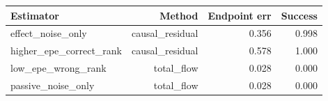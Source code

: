 \begin{tabular}{lrrr}
\toprule
Estimator & Method & Endpoint err & Success\\
\midrule
effect\_noise\_only & causal\_residual & 0.356 & 0.998\\
higher\_epe\_correct\_rank & causal\_residual & 0.578 & 1.000\\
low\_epe\_wrong\_rank & total\_flow & 0.028 & 0.000\\
passive\_noise\_only & total\_flow & 0.028 & 0.000\\
\bottomrule
\end{tabular}
